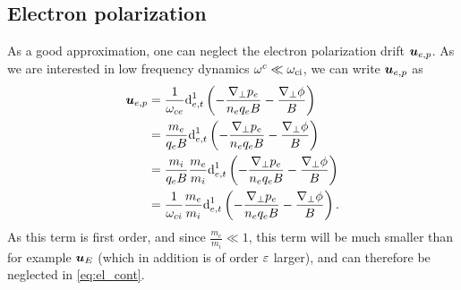 \subsection{Electron polarization}
\label{sec:no_e_pol}
%
As a good approximation, one can neglect the electron polarization drift $\boldsymbol{u}_{e,p}$.
As we are interested in low frequency dynamics $\omega^c\ll\omega_{\text{ci}}$, we can write $\boldsymbol{u}_{e,p}$ as
%
\begin{align*}
    \ve{u}_{e,p}
    &=
      \frac{1}{\om_{ce}}\d^1_{e,t}\L(
      - \frac{\grad_\perp p_e}{n_e  q_e B}
      - \frac{\grad_\perp \phi}{B}
      \R)\\
%
    &=
      \frac{m_e}{q_eB}\d^1_{e,t}\L(
      - \frac{\grad_\perp p_e}{n_e  q_e B}
      - \frac{\grad_\perp \phi}{B}
      \R)\\
%
    &=
      \frac{m_i}{q_eB}\frac{m_e}{m_i}\d^1_{e,t}\L(
      - \frac{\grad_\perp p_e}{n_e  q_e B}
      - \frac{\grad_\perp \phi}{B}
      \R)\\
%
    &=
    \frac{1}{\om_{ci}}\frac{m_e}{m_i}\d^1_{e,t}\L(
      - \frac{\grad_\perp p_e}{n_e  q_e B}
      - \frac{\grad_\perp \phi}{B}
      \R).
\end{align*}
%
As this term is first order, and since $\frac{m_e}{m_i} \ll 1$, this term will be much smaller than for example $\boldsymbol{u}_E$ (which in addition is of order $\varepsilon$ larger), and can therefore be neglected in \cref{eq:el_cont}.

